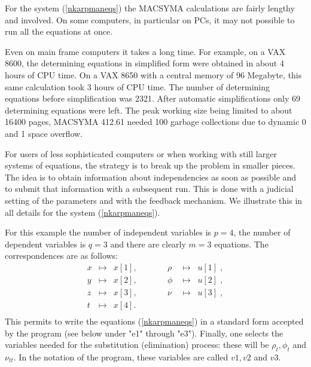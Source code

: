{\nopagebreak
For the system (\ref{nkarpmaneqs})
the MACSYMA calculations are fairly lengthy and involved. On some
computers, in particular on PCs, it may not possible to run all the equations 
at once.

\nopagebreak
Even on main frame computers it takes a long time.
For example, on a VAX 8600, 
the determining equations in simplified form were obtained in about 4 hours
of CPU time.
On a VAX 8650 with a central memory of 96 Megabyte, this same calculation took
3 hours of CPU time.
The number of determining equations before simplification was
2321. After automatic simplifications only 69 determining equations were left.
The peak working size being limited to about 16400 pages,
MACSYMA 412.61 needed 100 garbage collections due to 
dynamic 0 and 1 space overflow.

\pagebreak
For users of less sophisticated computers or when working with still larger
systems of equations, the strategy is to break up the problem in 
smaller pieces. 
The idea is to obtain information about independencies as soon as possible 
and to submit that information with a subsequent run.
This is done with a judicial setting of the parameters and with the
feedback mechanism. We illustrate this in all details for the
system (\ref{nkarpmaneqs}).

\nopagebreak
For this example the number of independent variables is $p=4$, 
the number of dependent variables is $q = 3$ and there are clearly $m=3$ 
equations.
The correspondences are as follows:
\begin{equation}
\begin{array}{rclcrcl}
x & \longmapsto & x[1], & \quad \quad & \rho  & \longmapsto & u[1] \; ,\\ 
y & \longmapsto & x[2], & \quad \quad &  \phi & \longmapsto & u[2] \; ,\\
z & \longmapsto & x[3], & \quad \quad &  \nu &  \longmapsto & u[3] \; , \\ 
t & \longmapsto & x[4]. & \quad \quad  & \quad & \quad & \quad  \\ 
\end{array}
\end{equation}
This permits to write the equations (\ref{nkarpmaneqs}) 
in a standard form accepted by the program (see below under "e1" 
through "e3").
Finally, one selects the variables needed for the substitution 
(elimination) process:
these will be $\rho_t , \phi_t$ and $\nu_{tt} .$
In the notation of the program, these variables are called 
$v1, v2$ and $v3$.

}
